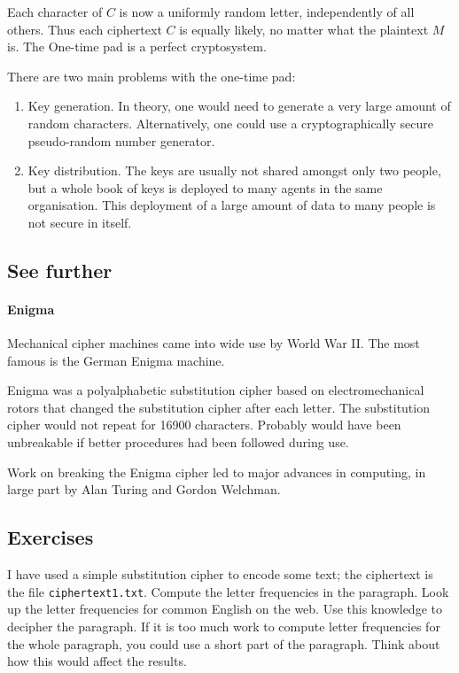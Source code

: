 \documentclass[a4paper, 11pt, openany]{book}
\begin{document}
Each character of $C$ is now a uniformly random letter, independently of all others. Thus each ciphertext $C$ is equally likely, no matter what the plaintext $M$ is. The One-time pad is a perfect cryptosystem.

There are two main problems with the one-time pad:
\begin{enumerate}
    \item Key generation. In theory, one would need to generate a very large amount of random characters. Alternatively, one could use a cryptographically secure pseudo-random number generator.

    \item Key distribution. The keys are usually not shared amongst only two people, but a whole book of keys is deployed to many agents in the same organisation. This deployment of a large amount of data to many people is not secure in itself.
\end{enumerate}




\subsection{See further}

\paragraph{Enigma}
Mechanical cipher machines came into wide use by World War II. The most famous is the German Enigma machine.

Enigma was a polyalphabetic substitution cipher based on electromechanical rotors that changed the substitution cipher after each letter. The substitution cipher would not repeat for 16900 characters. Probably would have been unbreakable if better procedures had been followed during use.

Work on breaking the Enigma cipher led to major advances in computing, in large part by Alan Turing and Gordon Welchman.




\subsection{Exercises}

\begin{exercise} \label{exercise:substitution1}
I have used a simple substitution cipher to encode some text; the ciphertext is the file \texttt{ciphertext1.txt}. Compute the letter frequencies in the paragraph. Look up the letter frequencies for common English on the web. Use this knowledge to decipher the paragraph. If it is too much work to compute letter frequencies for the whole paragraph, you could use a short part of the paragraph. Think about how this would affect the results.
\end{exercise}
\end{document}
